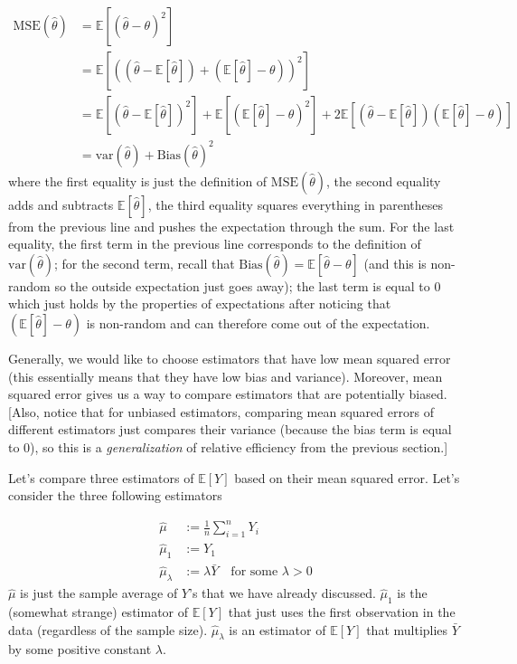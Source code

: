 \documentclass[
  letterpaper,
  DIV=11,
  numbers=noendperiod]{scrreprt}
\begin{document}
\[
  \begin{aligned}
    \textrm{MSE}(\hat{\theta}) &= \mathbb{E}\left[ (\hat{\theta} - \theta)^2\right] \\
    &= \mathbb{E}\left[ \left( (\hat{\theta} - \mathbb{E}[\hat{\theta}]) + (\mathbb{E}[\hat{\theta}] - \theta)\right)^2 \right] \\
    &= \mathbb{E}\left[ (\hat{\theta} - \mathbb{E}[\hat{\theta}])^2 \right] + \mathbb{E}\left[ (\mathbb{E}[\hat{\theta}] - \theta)^2\right] + 2 \mathbb{E}\left[ (\hat{\theta} - \mathbb{E}[\hat{\theta}])(\mathbb{E}[\hat{\theta}] - \theta) \right] \\
    &= \mathrm{var}(\hat{\theta}) + \textrm{Bias}(\hat{\theta})^2 
  \end{aligned}
\] where the first equality is just the definition of
\(\textrm{MSE}(\hat{\theta})\), the second equality adds and subtracts
\(\mathbb{E}[\hat{\theta}]\), the third equality squares everything in
parentheses from the previous line and pushes the expectation through
the sum. For the last equality, the first term in the previous line
corresponds to the definition of \(\mathrm{var}(\hat{\theta})\); for the
second term, recall that
\(\textrm{Bias}(\hat{\theta}) = \mathbb{E}[\hat{\theta}-\theta]\) (and
this is non-random so the outside expectation just goes away); the last
term is equal to 0 which just holds by the properties of expectations
after noticing that \((\mathbb{E}[\hat{\theta}] - \theta)\) is
non-random and can therefore come out of the expectation.

Generally, we would like to choose estimators that have low mean squared
error (this essentially means that they have low bias and variance).
Moreover, mean squared error gives us a way to compare estimators that
are potentially biased. {[}Also, notice that for unbiased estimators,
comparing mean squared errors of different estimators just compares
their variance (because the bias term is equal to 0), so this is a
\emph{generalization} of relative efficiency from the previous
section.{]}

Let's compare three estimators of \(\mathbb{E}[Y]\) based on their mean
squared error. Let's consider the three following estimators

\[
  \begin{aligned}
    \hat{\mu} &:= \frac{1}{n} \sum_{i=1}^n Y_i \\
    \hat{\mu}_1 &:= Y_1 \\
    \hat{\mu}_\lambda &:= \lambda \bar{Y} \quad \textrm{for some } \lambda > 0 
  \end{aligned}
\] \(\hat{\mu}\) is just the sample average of \(Y\)'s that we have
already discussed. \(\hat{\mu}_1\) is the (somewhat strange) estimator
of \(\mathbb{E}[Y]\) that just uses the first observation in the data
(regardless of the sample size). \(\hat{\mu}_\lambda\) is an estimator
of \(\mathbb{E}[Y]\) that multiplies \(\bar{Y}\) by some positive
constant \(\lambda\).
\end{document}
